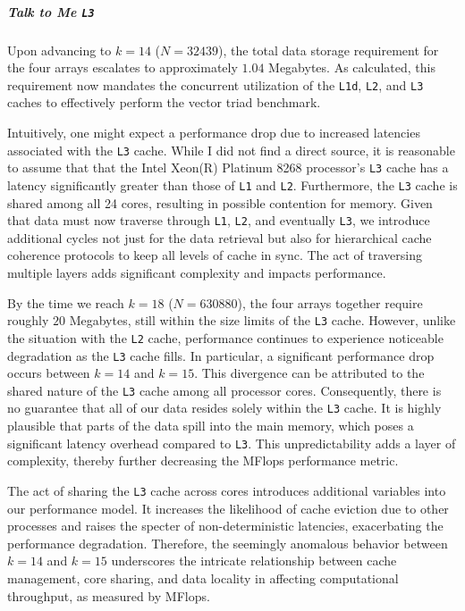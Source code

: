 \documentclass{article}
\begin{document}
\subparagraph*{Talk to Me \texttt{L3}} Upon advancing to \( k = 14 \) (\( N = 32439 \)), the total data storage requirement for the four arrays escalates to approximately \( 1.04 \) Megabytes. As calculated, this requirement now mandates the concurrent utilization of the \texttt{L1d}, \texttt{L2}, and \texttt{L3} caches to effectively perform the vector triad benchmark.

Intuitively, one might expect a performance drop due to increased latencies associated with the \texttt{L3} cache. While I did not find a direct source, it is reasonable to assume that that the Intel Xeon(R) Platinum 8268 processor's \texttt{L3} cache has a latency significantly greater than those of \texttt{L1} and \texttt{L2}. Furthermore, the \texttt{L3} cache is shared among all 24 cores, resulting in possible contention for memory. 
Given that data must now traverse through \texttt{L1}, \texttt{L2}, and eventually \texttt{L3}, we introduce additional cycles not just for the data retrieval but also for hierarchical cache coherence protocols to keep all levels of cache in sync. The act of traversing multiple layers adds significant complexity and impacts performance.

By the time we reach \( k = 18 \) (\( N = 630880 \)), the four arrays together require roughly \( 20 \) Megabytes, still within the size limits of the \texttt{L3} cache. However, unlike the situation with the \texttt{L2} cache, performance continues to experience noticeable degradation as the \texttt{L3} cache fills. In particular, a significant performance drop occurs between \( k = 14 \) and \( k = 15 \). This divergence can be attributed to the shared nature of the \texttt{L3} cache among all processor cores. Consequently, there is no guarantee that all of our data resides solely within the \texttt{L3} cache. It is highly plausible that parts of the data spill into the main memory, which poses a significant latency overhead compared to \texttt{L3}. This unpredictability adds a layer of complexity, thereby further decreasing the MFlops performance metric.

The act of sharing the \texttt{L3} cache across cores introduces additional variables into our performance model. It increases the likelihood of cache eviction due to other processes and raises the specter of non-deterministic latencies, exacerbating the performance degradation. Therefore, the seemingly anomalous behavior between \( k = 14 \) and \( k = 15 \) underscores the intricate relationship between cache management, core sharing, and data locality in affecting computational throughput, as measured by MFlops.
\end{document}

